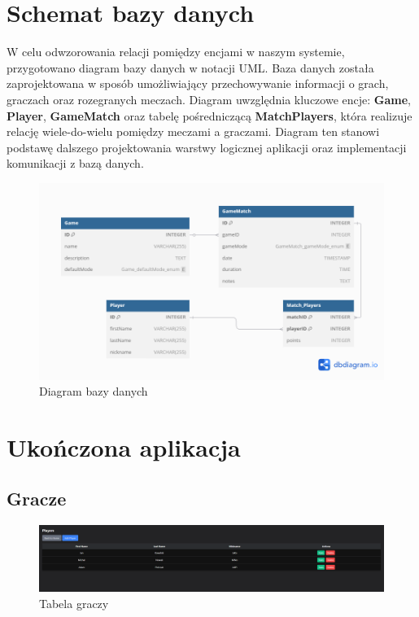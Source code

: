 \documentclass[12pt,a4paper]{article}
\begin{document}
\begin{enumerate}
\section{Schemat bazy danych}

W celu odwzorowania relacji pomiędzy encjami w naszym systemie, przygotowano diagram bazy danych w notacji UML. Baza danych została zaprojektowana w sposób umożliwiający przechowywanie informacji o grach, graczach oraz rozegranych meczach. Diagram uwzględnia kluczowe encje: \textbf{Game}, \textbf{Player}, \textbf{GameMatch} oraz tabelę pośredniczącą \textbf{MatchPlayers}, która realizuje relację wiele-do-wielu pomiędzy meczami a graczami. Diagram ten stanowi podstawę dalszego projektowania warstwy logicznej aplikacji oraz implementacji komunikacji z bazą danych.

\begin{figure}[H]
	\centering
	\includegraphics[width=1\linewidth]{media/baza_danych}
	\caption{Diagram bazy danych}
	\label{fig:bazadanych}
\end{figure}

\section{Ukończona aplikacja}

\subsection{Gracze}

\begin{figure}[H]
	\centering
	\includegraphics[width=1\linewidth]{media/1.png}
	\caption{Tabela graczy}
	\label{fig:tabelagraczy}
\end{figure}


\end{enumerate}
\end{document}
